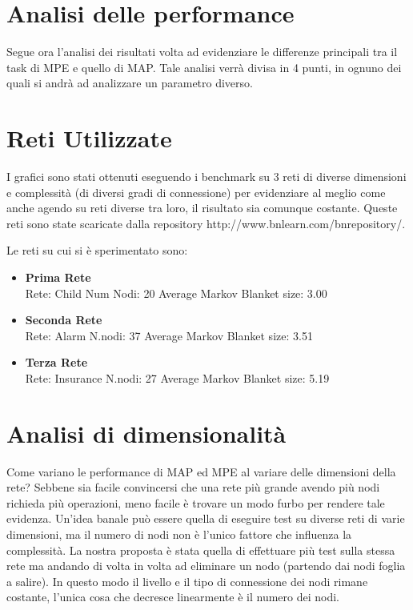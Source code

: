 \section{Analisi delle performance}

Segue ora l’analisi dei risultati volta ad evidenziare le differenze principali tra il task di MPE e quello di MAP. Tale analisi verrà divisa in 4 punti, in ognuno dei quali si andrà ad analizzare un parametro diverso. 

\section{Reti Utilizzate}
I grafici sono stati ottenuti eseguendo i benchmark su 3 reti di diverse dimensioni e complessità (di diversi gradi di connessione) per evidenziare al meglio come anche agendo su reti diverse tra loro, il risultato sia comunque costante. Queste reti sono state scaricate dalla repository http://www.bnlearn.com/bnrepository/.

Le reti su cui si è sperimentato sono:

\begin{itemize}
\item \textbf{Prima Rete}\\ 
Rete: Child
Num Nodi: 20
Average Markov Blanket size: 3.00

\item \textbf{Seconda Rete}\\ 
Rete: Alarm
N.nodi: 37
Average Markov Blanket size: 3.51

\item \textbf{Terza Rete}\\ 
Rete: Insurance
N.nodi: 27
Average Markov Blanket size: 5.19
\end{itemize}

\section{Analisi di dimensionalità}
Come variano le performance di MAP ed MPE al variare delle dimensioni della rete? Sebbene sia facile convincersi che una rete più grande avendo più nodi richieda più operazioni, meno facile è trovare un modo furbo per rendere tale evidenza.  Un’idea banale può essere quella di eseguire test su diverse reti di varie dimensioni, ma il numero di nodi non è l’unico fattore che influenza la complessità. La nostra proposta è stata quella di effettuare più test sulla stessa rete ma andando di volta in volta ad eliminare un nodo (partendo dai nodi foglia a salire). In questo modo il livello e il tipo di connessione dei nodi rimane costante, l’unica cosa che decresce linearmente è il numero dei nodi.


